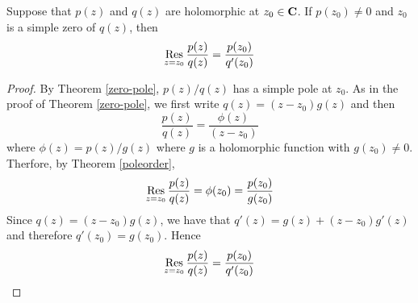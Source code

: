 \begin{theorem}\label{respolesimp}
Suppose that $p(z)$ and $q(z)$ are holomorphic at $z_0 \in \mathbf C$. If $p(z_0) \neq 0$ and $z_0$ is a simple zero of $q(z)$, then 
\[\underset{z = {z_0}}{\operatorname{Res}}\,\frac{p(z)}{q(z)} = \frac{p(z_0)}{q'(z_0)}\]
\end{theorem}
\begin{proof}
By Theorem \ref{zero-pole}, $p(z)/q(z)$ has a simple pole at $z_0$. As in the proof of Theorem \ref{zero-pole}, we first write $q(z) = (z - z_0)g(z)$ and then
\[\frac{p(z)}{q(z)} = \frac{\phi(z)}{(z - z_0)}\]
where $\phi(z) = p(z)/g(z)$ where $g$ is a holomorphic function with $g(z_0) \neq 0$. Therfore, by Theorem \ref{poleorder},
\[\underset{z = {z_0}}{\operatorname{Res}}\,\frac{p(z)}{q(z)} = \phi(z_0) = \frac{p(z_0)}{g(z_0)}\]
Since $q(z) = (z - z_0)g(z)$, we have that $q'(z) = g(z) + (z - z_0)g'(z)$ and therefore $q'(z_0) = g(z_0)$. Hence
\[\underset{z = {z_0}}{\operatorname{Res}}\,\frac{p(z)}{q(z)} = \frac{p(z_0)}{q'(z_0)}\]
\end{proof}

\vspace*{1em}


